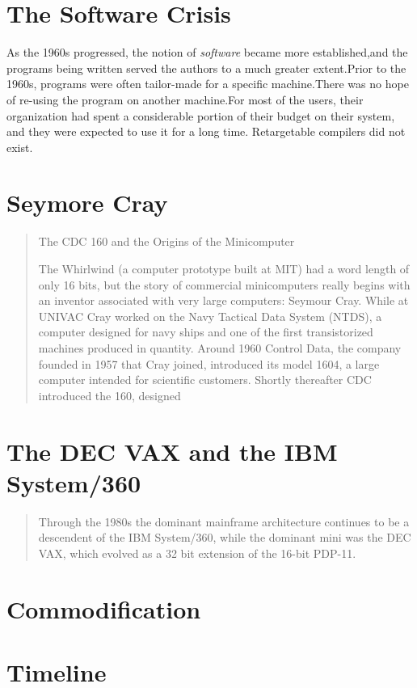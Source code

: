 \section{The Software Crisis}
As the 1960s progressed, 
the notion of 
\textit{software} became more established,and the programs being written served the authors to a 
much greater extent.Prior to the 1960s, programs were often tailor-made for a specific 
machine.There was no hope of re-using the program on another machine.For most of the users, their 
organization had spent a considerable portion of their budget on their system, and they were 
expected to use it for a long time. Retargetable compilers did not exist.

\section{Seymore Cray}
\begin{quotation}
    The CDC 160 and the Origins of the Minicomputer
    
    The Whirlwind (a computer prototype built at 
MIT) had a word length of only 16 bits, but the story of commercial minicomputers really begins with 
an inventor associated with very large computers: Seymour Cray. While at UNIVAC Cray worked on the 
Navy Tactical Data System (NTDS), a computer designed for navy ships and one of the first 
transistorized machines produced in quantity. Around 1960 Control Data, the company founded in 1957 
that Cray joined, introduced its model 1604, a large computer intended for scientific customers. 
Shortly thereafter CDC introduced the 160, designed
\cite{nothing_new_since_von_neumann_2000}
\end{quotation}
\section{The DEC VAX and the IBM System/360}
\begin{quotation}
    Through the 1980s the dominant mainframe architecture continues to be a descendent of the IBM 
System/360, while the dominant mini was the DEC VAX, which evolved as a 32 bit extension of the 
16-bit PDP-11.
\cite{nothing_new_since_von_neumann_2000}
\end{quotation}


\section{Commodification}
\pagebreak
\section{Timeline}

